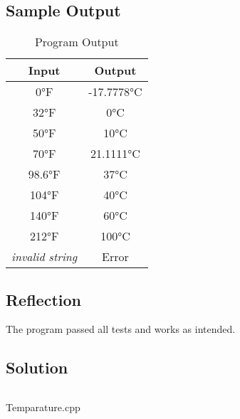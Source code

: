 \documentclass[main.tex]{subfiles}
\begin{document}
        \subsection{Sample Output}
            \begin{table}[H]
                \centering
                \begin{tabular}{c c}
                    \hline
                    \textbf{Input} & \textbf{Output} \\
                    \hline
                    0°F & -17.7778°C \\
                    32°F & 0°C \\
                    50°F & 10°C \\
                    70°F & 21.1111°C \\
                    98.6°F & 37°C \\
                    104°F & 40°C \\
                    140°F & 60°C \\
                    212°F & 100°C \\
                    \textit{invalid string} & Error \\
                    \hline
                \end{tabular}
                \caption{Program Output}
            \end{table}

        \subsection{Reflection}
            The program passed all tests and works as intended.
        
        \subsection{Solution}
            \begin{listing}[!ht]
                \inputminted[firstline=6]{cpp}{../Tasks/02-Temperature/Temperature.cpp}
                \caption{Temparature.cpp}
            \end{listing}
\end{document}

